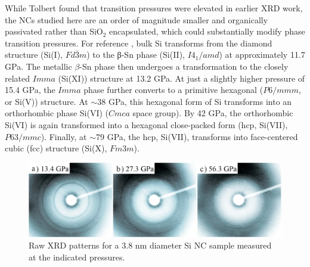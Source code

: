 While Tolbert found that transition pressures were elevated in earlier XRD work, the NCs studied here are an order of magnitude smaller and organically passivated rather than SiO$_2$ encapsulated, which could substantially modify phase transition pressures. For reference \cite{PhysRevB.41.12021,katzke2007structural,olijnyk1984structural}, bulk Si transforms from the diamond structure (Si(I), $Fd\bar{3}m$) to the β-Sn phase (Si(II), $I4_1/amd$) at approximately 11.7 GPa. The metallic $\beta$-Sn phase then undergoes a transformation to the closely related $Imma$ (Si(XI)) structure at 13.2 GPa. At just a slightly higher pressure of 15.4 GPa, the $Imma$ phase further converts to a primitive hexagonal ($P6/mmm$, or Si(V)) structure. At $\sim$38 GPa, this hexagonal form of Si transforms into an orthorhombic phase Si(VI) ($Cmca$ space group). By 42 GPa, the orthorhombic Si(VI) is again transformed into a hexagonal close-packed form (hcp, Si(VII), $P63/mmc$). Finally, at $\sim$79 GPa, the hcp, Si(VII), transforms into face-centered cubic (fcc) structure (Si(X), $Fm3m$). \par

\begin{figure}
\begin{center}
\includegraphics[width=\textwidth]{./chapter7/sipressure2.jpeg}
\caption[Two-dimensional pressure dependent XRD data for Si nanocrystals.]{Raw XRD patterns for a 3.8 nm diameter Si NC sample measured at the indicated pressures.}
\label{f:sipressure2}
\end{center}
\end{figure}

